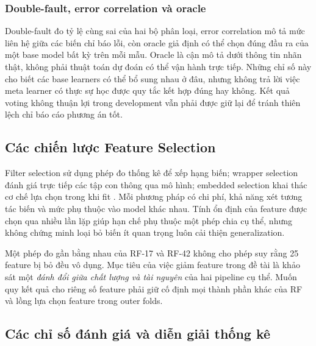 \subsubsection{Double-fault, error correlation và oracle}
Double-fault đo tỷ lệ cùng sai của hai bộ phân loại, error correlation mô tả mức liên hệ giữa các biến chỉ báo lỗi, còn oracle giả định có thể chọn đúng đầu ra của một base model bất kỳ trên mỗi mẫu. Oracle là cận mô tả dưới thông tin nhãn thật, không phải thuật toán dự đoán có thể vận hành trực tiếp. Những chỉ số này cho biết các base learners có thể bổ sung nhau ở đâu, nhưng không trả lời việc meta learner có thực sự học được quy tắc kết hợp đúng hay không. Kết quả voting không thuận lợi trong development vẫn phải được giữ lại để tránh thiên lệch chỉ báo cáo phương án tốt.

\subsection{Các chiến lược Feature Selection}
Filter selection sử dụng phép đo thống kê để xếp hạng biến; wrapper selection đánh giá trực tiếp các tập con thông qua mô hình; embedded selection khai thác cơ chế lựa chọn trong khi fit \cite{legacyL08,legacyL12}. Mỗi phương pháp có chi phí, khả năng xét tương tác biến và mức phụ thuộc vào model khác nhau. Tính ổn định của feature được chọn qua nhiều lần lặp giúp hạn chế phụ thuộc một phép chia cụ thể, nhưng không chứng minh loại bỏ biến ít quan trọng luôn cải thiện generalization.

Một phép đo gần bằng nhau của RF-17 và RF-42 không cho phép suy rằng 25 feature bị bỏ đều vô dụng. Mục tiêu của việc giảm feature trong đề tài là khảo sát một \emph{đánh đổi giữa chất lượng và tài nguyên} của hai pipeline cụ thể. Muốn quy kết quả cho riêng số feature phải giữ cố định mọi thành phần khác của RF và lồng lựa chọn feature trong outer folds.

\subsection{Các chỉ số đánh giá và diễn giải thống kê}
